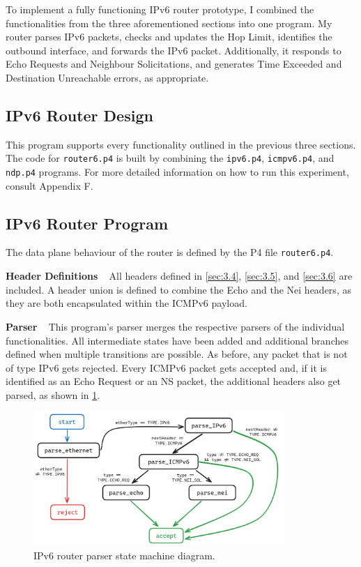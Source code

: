 To implement a fully functioning IPv6 router prototype, I combined the functionalities from the three aforementioned sections into one program. My router parses IPv6 packets, checks and updates the Hop Limit, identifies the outbound interface, and forwards the IPv6 packet. Additionally, it responds to Echo Requests and Neighbour Solicitations, and generates Time Exceeded and Destination Unreachable errors, as appropriate.

\subsection{IPv6 Router Design}
\label{sec:3.7.1}

This program supports every functionality outlined in the previous three sections. The code for \texttt{router6.p4} is built by combining the \texttt{ipv6.p4}, \texttt{icmpv6.p4}, and \texttt{ndp.p4} programs. For more detailed information on how to run this experiment, consult Appendix F.

\subsection{IPv6 Router Program}
\label{sec:3.7.2}

The data plane behaviour of the router is defined by the P4 file \texttt{router6.p4}.

\textbf{Header Definitions} ~ All headers defined in \cref{sec:3.4}, \cref{sec:3.5}, and \cref{sec:3.6} are included. A header union is defined to combine the Echo and the Nei headers, as they are both encapsulated within the ICMPv6 payload.

\textbf{Parser} ~ This program's parser merges the respective parsers of the individual functionalities. All intermediate states have been added and additional branches defined when multiple transitions are possible. As before, any packet that is not of type IPv6 gets rejected. Every ICMPv6 packet gets accepted and, if it is identified as an Echo Request or an NS packet, the additional headers also get parsed, as shown in \cref{fig:impl-router6parser}.

\begin{figure}[htbp]
  \centering
    \includegraphics[width=0.85\textwidth]{figures/implementation/router6_parser.jpg}
     \caption{IPv6 router parser state machine diagram.}
     \label{fig:impl-router6parser}
\end{figure}

